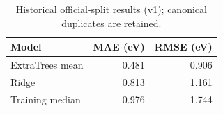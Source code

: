 \begin{table}[htbp]\centering\small
\caption{Historical official-split results (v1); canonical duplicates are retained.}
\begin{tabular}{lrr}
\toprule
Model & MAE (eV) & RMSE (eV) \\
\midrule
ExtraTrees mean & 0.481 & 0.906 \\
Ridge & 0.813 & 1.161 \\
Training median & 0.976 & 1.744 \\
\bottomrule
\end{tabular}\end{table}
